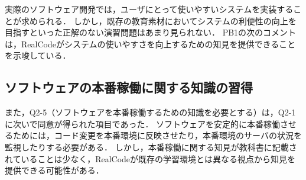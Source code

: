 
実際のソフトウェア開発では，ユーザにとって使いやすいシステムを実装することが求められる．
しかし，既存の教育素材においてシステムの利便性の向上を目指すといった正解のない演習問題はあまり見られない．
PB1の次のコメントは，RealCodeがシステムの使いやすさを向上するための知見を提供できることを示唆している．





\subsection*{ソフトウェアの本番稼働に関する知識の習得}

また，Q2-5（ソフトウェアを本番稼働するための知識を必要とする）は，Q2-1に次いで同意が得られた項目であった．
ソフトウェアを安定的に本番稼働させるためには，コード変更を本番環境に反映させたり，本番環境のサーバの状況を監視したりする必要がある．
しかし，本番稼働に関する知見が教科書に記載されていることは少なく，RealCodeが既存の学習環境とは異なる視点から知見を提供できる可能性がある．




























